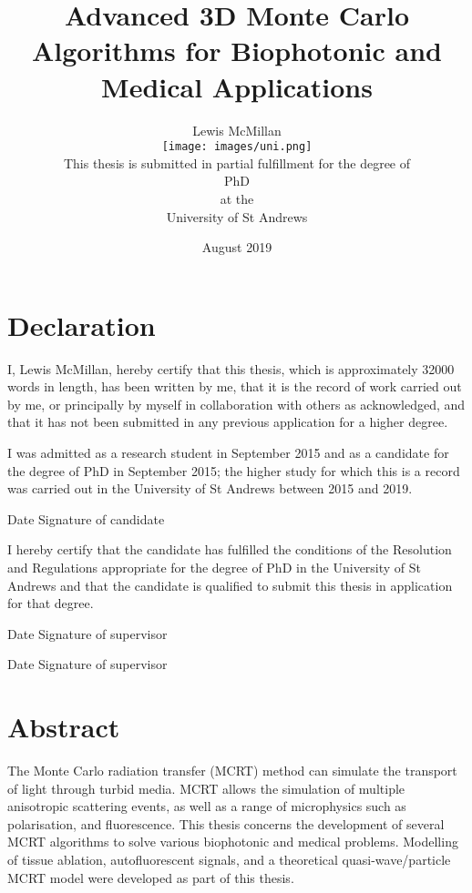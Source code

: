 \documentclass[10pt,a4paper,twoside]{book}
\title{Advanced 3D Monte Carlo Algorithms for Biophotonic and Medical Applications}
\author{\Large Lewis McMillan\\
\texttt{[image: images/uni.png]}\\
This thesis is submitted in partial fulfillment for the degree of \\
PhD\\ 
at the \\
University of St Andrews}
\date{August 2019}
\begin{document}
\frontmatter%

\maketitle
{}%

\chapter{Declaration}
I, Lewis McMillan, hereby certify that this thesis, which is approximately 32000 words in length,
has been written by me, that it is the record of work carried out by me, or principally by myself in collaboration with others as acknowledged, and that it has not been submitted in any
previous application for a higher degree.
\medskip

I was admitted as a research student in September 2015 and as a candidate for the degree
of PhD in September 2015; the higher study for which this is a record was carried out in the
University of St Andrews between 2015 and 2019.

\medskip

Date\dotfill \hspace{1cm} Signature of candidate \dotfill

\medskip

I hereby certify that the candidate has fulfilled the conditions of the Resolution and Regulations appropriate for the degree of PhD in the University of St Andrews and that the candidate
is qualified to submit this thesis in application for that degree.

\medskip

Date\dotfill \hspace{1cm} Signature of supervisor \dotfill

\medskip

\indent Date\dotfill \hspace{1cm} Signature of supervisor \dotfill

\chapter{Abstract}
The Monte Carlo radiation transfer (MCRT) method can simulate the transport of light through turbid media.
MCRT allows the simulation of multiple anisotropic scattering events, as well as a range of microphysics such as polarisation, and fluorescence.
This thesis concerns the development of several MCRT algorithms to solve various biophotonic and medical problems.
Modelling of tissue ablation, autofluorescent signals, and a theoretical quasi-wave/particle MCRT model were developed as part of this thesis.
\end{document}
